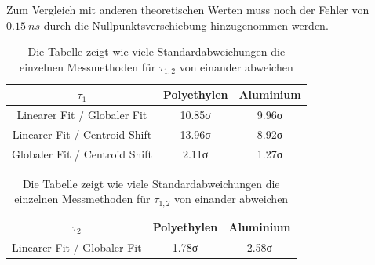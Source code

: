 \documentclass[a4paper,12pt]{article}
\begin{document}
Zum Vergleich mit anderen theoretischen Werten muss noch der Fehler von $\SI{0.15}{ns}$ durch die
Nullpunktsverschiebung hinzugenommen werden.
\begin{table}[h]
	\centering
	\begin{tabular}{c |c |c }
	$\tau_{1}$ & Polyethylen & Aluminium \\
	\hline
	Linearer Fit / Globaler Fit   & 10.85σ & 9.96σ \\
	Linearer Fit / Centroid Shift & 13.96σ & 8.92σ  \\
	Globaler Fit / Centroid Shift &  2.11σ & 1.27σ \\
	\end{tabular}

	\vspace*{0.5cm}
	\begin{tabular}{c |c |c }
	$\tau_{2}$ & Polyethylen & Aluminium\\
	\hline
	Linearer Fit / Globaler Fit\hspace*{0.37cm} & 1.78σ & 2.58σ\\
	\end{tabular}
	\caption{Die Tabelle zeigt wie viele Standardabweichungen die einzelnen Messmethoden für $\tau_{1,2}$ von einander abweichen}
	\label{tab:finalsigma}
\end{table}
\end{document}
